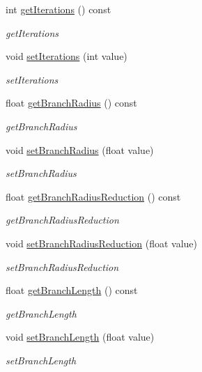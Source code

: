 \begin{DoxyCompactItemize}
int \hyperlink{classLSystem_a704c6d2fed8cdc1dd0d298d4172cf54b}{get\+Iterations} () const
\begin{DoxyCompactList}\small\item\em get\+Iterations \end{DoxyCompactList}\item 
void \hyperlink{classLSystem_ab4cf1ae8b7ba189c6078970be98df8e7}{set\+Iterations} (int value)
\begin{DoxyCompactList}\small\item\em set\+Iterations \end{DoxyCompactList}\item 
float \hyperlink{classLSystem_ae4392bb48f3e6cb1e75099cefbf9fa18}{get\+Branch\+Radius} () const
\begin{DoxyCompactList}\small\item\em get\+Branch\+Radius \end{DoxyCompactList}\item 
void \hyperlink{classLSystem_a1c20e69f4d56292059fcb51409a7c1c1}{set\+Branch\+Radius} (float value)
\begin{DoxyCompactList}\small\item\em set\+Branch\+Radius \end{DoxyCompactList}\item 
float \hyperlink{classLSystem_a71a1f31a07f2dc97cfa5081c716b394c}{get\+Branch\+Radius\+Reduction} () const
\begin{DoxyCompactList}\small\item\em get\+Branch\+Radius\+Reduction \end{DoxyCompactList}\item 
void \hyperlink{classLSystem_a7a82ce235a7b591c862ddeb1daed1964}{set\+Branch\+Radius\+Reduction} (float value)
\begin{DoxyCompactList}\small\item\em set\+Branch\+Radius\+Reduction \end{DoxyCompactList}\item 
float \hyperlink{classLSystem_a8d4fb387b953c1e98ee02d24ca7c9770}{get\+Branch\+Length} () const
\begin{DoxyCompactList}\small\item\em get\+Branch\+Length \end{DoxyCompactList}\item 
void \hyperlink{classLSystem_afda7870630630451988aa23d1fee2249}{set\+Branch\+Length} (float value)
\begin{DoxyCompactList}\small\item\em set\+Branch\+Length \end{DoxyCompactList}\item 

\end{DoxyCompactItemize}
